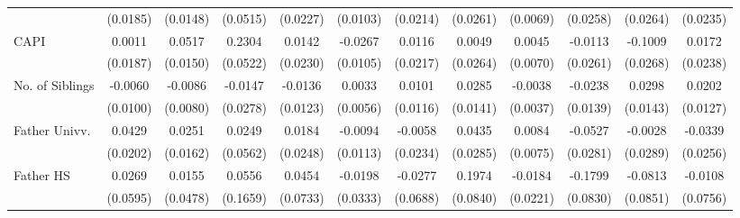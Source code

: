\begin{table}[htbp]
\begin{tabular}{l*{11}{c}}
            &    (0.0185)         &    (0.0148)         &    (0.0515)         &    (0.0227)         &    (0.0103)         &    (0.0214)         &    (0.0261)         &    (0.0069)         &    (0.0258)         &    (0.0264)         &    (0.0235)         \\
\addlinespace
CAPI        &      0.0011         &      0.0517\sym{***}&      0.2304\sym{***}&      0.0142         &     -0.0267\sym{*}  &      0.0116         &      0.0049         &      0.0045         &     -0.0113         &     -0.1009\sym{***}&      0.0172         \\
            &    (0.0187)         &    (0.0150)         &    (0.0522)         &    (0.0230)         &    (0.0105)         &    (0.0217)         &    (0.0264)         &    (0.0070)         &    (0.0261)         &    (0.0268)         &    (0.0238)         \\
\addlinespace
No. of Siblings&     -0.0060         &     -0.0086         &     -0.0147         &     -0.0136         &      0.0033         &      0.0101         &      0.0285\sym{*}  &     -0.0038         &     -0.0238         &      0.0298\sym{*}  &      0.0202         \\
            &    (0.0100)         &    (0.0080)         &    (0.0278)         &    (0.0123)         &    (0.0056)         &    (0.0116)         &    (0.0141)         &    (0.0037)         &    (0.0139)         &    (0.0143)         &    (0.0127)         \\
\addlinespace
Father Univv.&      0.0429\sym{*}  &      0.0251         &      0.0249         &      0.0184         &     -0.0094         &     -0.0058         &      0.0435         &      0.0084         &     -0.0527         &     -0.0028         &     -0.0339         \\
            &    (0.0202)         &    (0.0162)         &    (0.0562)         &    (0.0248)         &    (0.0113)         &    (0.0234)         &    (0.0285)         &    (0.0075)         &    (0.0281)         &    (0.0289)         &    (0.0256)         \\
\addlinespace
Father HS   &      0.0269         &      0.0155         &      0.0556         &      0.0454         &     -0.0198         &     -0.0277         &      0.1974\sym{*}  &     -0.0184         &     -0.1799\sym{*}  &     -0.0813         &     -0.0108         \\
            &    (0.0595)         &    (0.0478)         &    (0.1659)         &    (0.0733)         &    (0.0333)         &    (0.0688)         &    (0.0840)         &    (0.0221)         &    (0.0830)         &    (0.0851)         &    (0.0756)         \\

\end{tabular}
\end{table}
